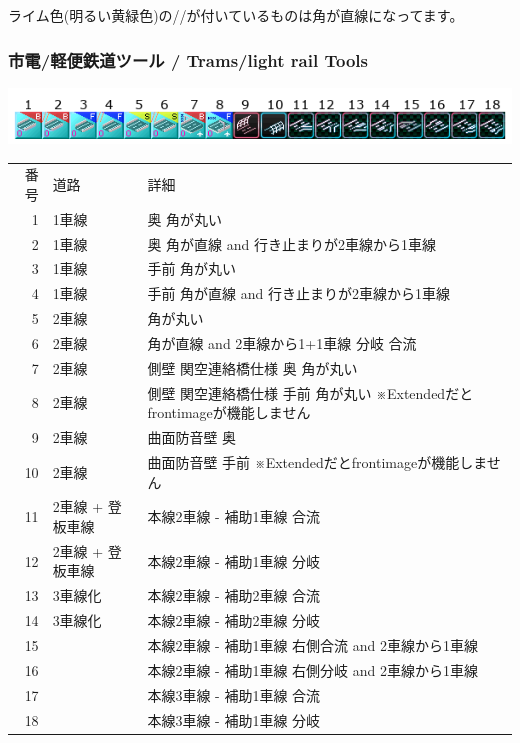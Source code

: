 \documentclass{jbook}
\begin{document}
\vspace{5pt}
ライム色(明るい黄緑色)の//が付いているものは角が直線になってます。

\newpage

\subsubsection*{市電/軽便鉄道ツール / Trams/light rail Tools}
\begin{flushleft}
  \includegraphics{picture/menu-2-1.png}
\end{flushleft}
\begin{tabular}{rll}
  番号 & 道路 & 詳細 \\
  1 & 1車線 & 奥 角が丸い \\
  2 & 1車線 & 奥 角が直線 and 行き止まりが2車線から1車線 \\
  3 & 1車線 & 手前 角が丸い \\
  4 & 1車線 & 手前 角が直線 and 行き止まりが2車線から1車線 \\
  5 & 2車線 & 角が丸い \\
  6 & 2車線 & 角が直線 and 2車線から1+1車線 分岐 合流 \\
  7 & 2車線 & 側壁 関空連絡橋仕様 奥 角が丸い \\
  8 & 2車線 & 側壁 関空連絡橋仕様 手前 角が丸い ※Extendedだとfrontimageが機能しません\\
  9 & 2車線 & 曲面防音壁 奥\\
  10 & 2車線 & 曲面防音壁 手前 ※Extendedだとfrontimageが機能しません\\
  11 & 2車線 + 登板車線 & 本線2車線 - 補助1車線 合流\\
  12 & 2車線 + 登板車線 & 本線2車線 - 補助1車線 分岐\\
  13 & 3車線化 & 本線2車線 - 補助2車線 合流\\
  14 & 3車線化 & 本線2車線 - 補助2車線 分岐\\
  15 & & 本線2車線 - 補助1車線 右側合流 and 2車線から1車線\\
  16 & & 本線2車線 - 補助1車線 右側分岐 and 2車線から1車線\\
  17 & & 本線3車線 - 補助1車線 合流\\
  18 & & 本線3車線 - 補助1車線 分岐\\
\end{tabular}
\end{document}
